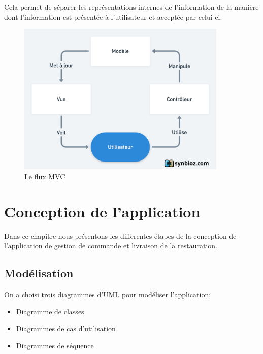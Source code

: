 \documentclass[french, a4paper, 12pt]{report}
\begin{document}
Cela permet de séparer les représentations internes de l'information de la manière dont l'information est présentée à l'utilisateur et acceptée par celui-ci.
\begin{figure}[!h]
  \center
  \includegraphics[width=10cm]{mvc.png}
  \caption{Le flux MVC}
  \label{fig:fluxmvc}
\end{figure}

\newpage
\chapter{Conception de l'application} Dans ce chapitre nous présentons les differentes étapes de la conception de l'application de gestion de commande et livraison de la restauration.
	\section{Modélisation} On a choisi trois diagrammes d’UML pour modéliser l'application:
		\begin{itemize}
			\item Diagramme de classes
			\item Diagrammes de cas d’utilisation
			\item Diagrammes de séquence
		\end{itemize}
		
		\newpage
\end{document}
